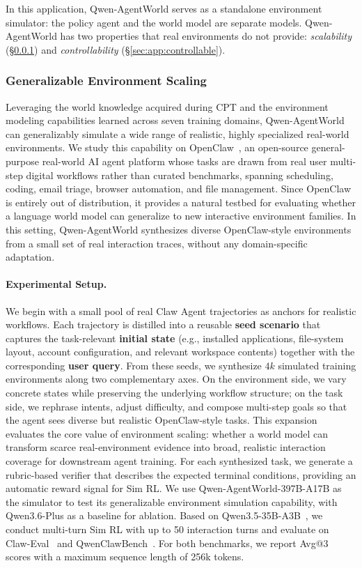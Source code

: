 \documentclass{llmxive}
\providecommand{\method}{Qwen-AgentWorld\xspace}
\begin{document}
In this application, \method serves as a standalone environment simulator: the policy agent and the world model are separate models.
\method has two properties that real environments do not provide: \emph{scalability} (\S\ref{sec:app:scaling}) and \emph{controllability} (\S\ref{sec:app:controllable}).

\subsubsection{Generalizable Environment Scaling}
\label{sec:app:scaling}




Leveraging the world knowledge acquired during CPT and the environment modeling capabilities learned across seven training domains, \method can generalizably simulate a wide range of realistic, highly specialized real-world environments.
We study this capability on OpenClaw~\citep{openclaw2026}, an open-source general-purpose real-world AI agent platform whose tasks are drawn from real user multi-step digital workflows rather than curated benchmarks, spanning scheduling, coding, email triage, browser automation, and file management.
Since OpenClaw is entirely out of distribution, it provides a natural testbed for evaluating whether a language world model can generalize to new interactive environment families.
In this setting, \method synthesizes diverse OpenClaw-style environments from a small set of real interaction traces, without any domain-specific adaptation.

\paragraph{Experimental Setup.}
We begin with a small pool of real Claw Agent trajectories as anchors for realistic workflows.
Each trajectory is distilled into a reusable \textbf{seed scenario} that captures the task-relevant \textbf{initial state} (e.g., installed applications, file-system layout, account configuration, and relevant workspace contents) together with the corresponding \textbf{user query}.
From these seeds, we synthesize $4k$ simulated training environments along two complementary axes.
On the environment side, we vary concrete states while preserving the underlying workflow structure; on the task side, we rephrase intents, adjust difficulty, and compose multi-step goals so that the agent sees diverse but realistic OpenClaw-style tasks.
This expansion evaluates the core value of environment scaling: whether a world model can transform scarce real-environment evidence into broad, realistic interaction coverage for downstream agent training.
For each synthesized task, we generate a rubric-based verifier that describes the expected terminal conditions, providing an automatic reward signal for Sim RL.
We use \method-397B-A17B as the simulator to test its generalizable environment simulation capability, with Qwen3.6-Plus as a baseline for ablation.
Based on Qwen3.5-35B-A3B~\citep{qwen35blog}, we conduct multi-turn Sim RL with up to 50 interaction turns and evaluate on Claw-Eval~\citep{ye2026claw} and QwenClawBench~\citep{qwenclawbench}.
For both benchmarks, we report Avg@3 scores with a maximum sequence length of 256k tokens.
\end{document}
